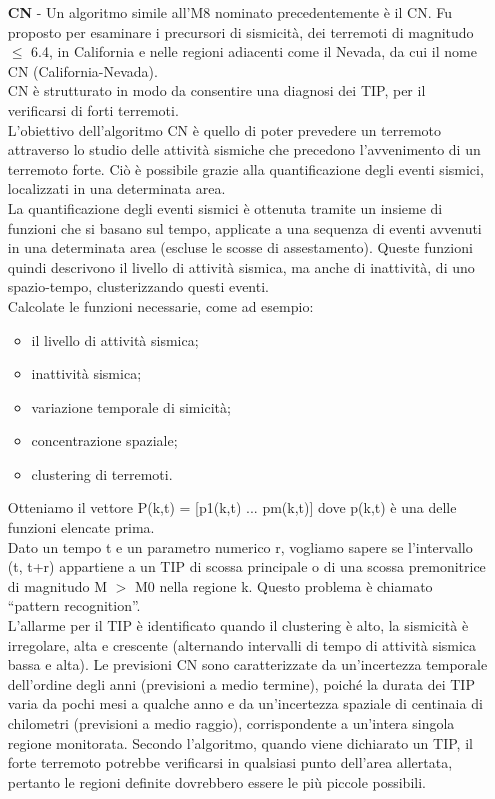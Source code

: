 \begin{itemize}
\item[\textbf{CN} -] Un algoritmo simile all'M8 nominato precedentemente \`e il CN. Fu proposto per esaminare i precursori di sismicit\`a, dei terremoti di magnitudo $\le$ 6.4, in California e nelle regioni adiacenti come il Nevada, da cui il nome CN (California-Nevada).\\
CN \`e strutturato in modo da consentire una diagnosi dei TIP, per il verificarsi di forti terremoti.\\
L'obiettivo dell'algoritmo CN \`e quello di poter prevedere un terremoto attraverso lo studio delle attivit\`a sismiche che precedono l'avvenimento di un terremoto forte. Ci\`o \`e possibile grazie alla quantificazione degli eventi sismici, localizzati in una determinata area.\\
La quantificazione degli eventi sismici \`e ottenuta tramite un insieme di funzioni che si basano sul tempo, applicate a una sequenza di eventi avvenuti in una determinata area (escluse le scosse di assestamento). Queste funzioni quindi descrivono il livello di attivit\`a sismica, ma anche di inattivit\`a, di uno spazio-tempo, clusterizzando questi eventi.\\
Calcolate le funzioni necessarie, come ad esempio:
\begin{itemize}
    \item il livello di attivit\`a sismica;
    \item inattivit\`a sismica;
    \item variazione temporale di simicit\`a;
    \item concentrazione spaziale;
    \item clustering di terremoti.
\end{itemize}
Otteniamo il vettore P(k,t) = [p1(k,t) ... pm(k,t)] dove p(k,t) \`e una delle funzioni elencate prima.\\
Dato un tempo t e un parametro numerico r, vogliamo sapere se l'intervallo (t, t+r) appartiene a un TIP di scossa principale o di una scossa premonitrice di magnitudo M $>$ M0 nella regione k.
Questo problema \`e chiamato ``pattern recognition''. \cite{TipsCN}\\
L'allarme per il TIP \`e identificato quando il clustering \`e alto, la sismicit\`a \`e irregolare, alta e crescente (alternando intervalli di tempo di attivit\`a sismica bassa e alta). Le previsioni CN sono caratterizzate da un'incertezza temporale dell'ordine degli anni (previsioni a medio termine), poich\'e la durata dei TIP varia da pochi mesi a qualche anno e da un'incertezza spaziale di centinaia di chilometri (previsioni a medio raggio), corrispondente a un'intera singola regione monitorata. Secondo l'algoritmo, quando viene dichiarato un TIP, il forte terremoto potrebbe verificarsi in qualsiasi punto dell'area allertata, pertanto le regioni definite dovrebbero essere le pi\`u piccole possibili. \cite{algortimoCN}
\end{itemize}
